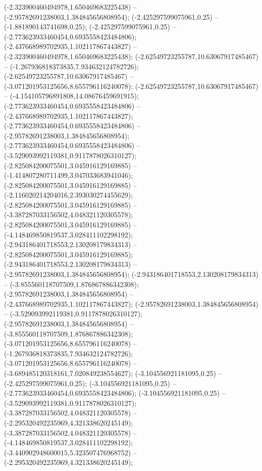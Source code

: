 (-2.323900460494978,1.650469683225438) -- (-2.95782691238003,1.384845656808954);
 (-2.425297599075961,0.25) -- (-1.881890143741698,0.25);
 (-2.425297599075961,0.25) -- (-2.773623933460454,0.6935558423484806);
 (-2.437668989702935,1.102117867443827) -- (-2.323900460494978,1.650469683225438);
 (-2.62549723255787,10.63067917485467) -- (-1.267936818373835,7.934632124782726);
 (-2.62549723255787,10.63067917485467) -- (-3.071201953125656,8.655796116240078);
 (-2.62549723255787,10.63067917485467) -- (-4.154105796891808,14.08676459691915);
 (-2.773623933460454,0.6935558423484806) -- (-2.437668989702935,1.102117867443827);
 (-2.773623933460454,0.6935558423484806) -- (-2.95782691238003,1.384845656808954);
 (-2.773623933460454,0.6935558423484806) -- (-3.529093992119381,0.9117878026310127);
 (-2.825084200075501,3.045916129169885) -- (-1.414807280711499,3.047033683941046);
 (-2.825084200075501,3.045916129169885) -- (-2.116020214204016,2.393030274455629);
 (-2.825084200075501,3.045916129169885) -- (-3.387287033156502,4.048321120305578);
 (-2.825084200075501,3.045916129169885) -- (-4.148469850819537,3.028411102298192);
 (-2.943186401718553,2.130208179834313) -- (-2.825084200075501,3.045916129169885);
 (-2.943186401718553,2.130208179834313) -- (-2.95782691238003,1.384845656808954);
 (-2.943186401718553,2.130208179834313) -- (-3.855560118707509,1.876867886342308);
 (-2.95782691238003,1.384845656808954) -- (-2.437668989702935,1.102117867443827);
 (-2.95782691238003,1.384845656808954) -- (-3.529093992119381,0.9117878026310127);
 (-2.95782691238003,1.384845656808954) -- (-3.855560118707509,1.876867886342308);
 (-3.071201953125656,8.655796116240078) -- (-1.267936818373835,7.934632124782726);
 (-3.071201953125656,8.655796116240078) -- (-3.689485120318161,7.020849238554627);
 (-3.104556921181095,0.25) -- (-2.425297599075961,0.25);
 (-3.104556921181095,0.25) -- (-2.773623933460454,0.6935558423484806);
 (-3.104556921181095,0.25) -- (-3.529093992119381,0.9117878026310127);
 (-3.387287033156502,4.048321120305578) -- (-2.295320492235969,4.321338620245149);
 (-3.387287033156502,4.048321120305578) -- (-4.148469850819537,3.028411102298192);
 (-3.440902948600015,5.323507476968752) -- (-2.295320492235969,4.321338620245149);
